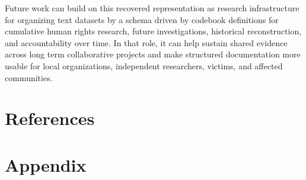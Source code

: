 \documentclass{article}
\begin{document}
Future work can build on this recovered representation as research infrastructure for organizing text datasets by a schema driven by codebook definitions for cumulative human rights research, future investigations, historical reconstruction, and accountability over time. In that role, it can help sustain shared evidence across long term collaborative projects and make structured documentation more usable for local organizations, independent researchers, victims, and affected communities.

\section*{References}

\appendix
\section{Appendix}\label{appendix}
\end{document}
